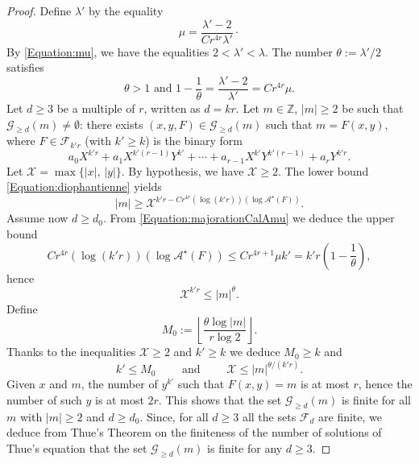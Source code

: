 \documentclass[10pt]{article}
\theoremstyle{definition}
\numberwithin{equation}{section}
\newcommand {\Z}{{\mathbb{Z}}}
\begin{document}
 
\begin{proof} Define $\lambda'$ by the equality 
\[
\mu = \frac{\lambda' -2} {C r^{4r} \lambda'}\cdotp
\]
By \eqref{Equation:mu}, we have the equalities $2 < \lambda' < \lambda$. The number $\theta := \lambda'/2$ satisfies
\[
\theta >1 \text{ and } 1-\frac 1 \theta = \frac{\lambda'-2}{\lambda'} = Cr^{4r}\mu.
\]
Let $d\geqslant 3$ be a multiple of $r$, written as $d=kr$. Let $m\in \Z$, $\vert m \vert \geqslant 2$ be such that $\mathcal G_{\geqslant d} (m) \neq \emptyset$: there exists $(x,y, F) \in {\mathcal G}_{\geqslant d} (m)$ such that $m=F(x,y)$, where $F\in \mathcal F_{k'r} $ (with $k'\geqslant k$) is the binary form
\[
a_0 X^{k'r} +a_1 X^{k'(r-1)} Y^{k'}+\cdots +a_{r-1} X^{k'} Y^{k'(r-1)} + a_r Y^{k'r}.
\]
Let $\mathcal X = \max \{ \vert x \vert, \, \vert y \vert \}$. By hypothesis, we have $\mathcal X \geqslant 2$. The lower bound \eqref{Equation:diophantienne} yields 
\[
\vert m \vert \geqslant \mathcal X^{k'r -Cr^{4r} (\log (k'r))(\log \mathcal A^\star (F))}.
\]
Assume now $d\geqslant d_0$. 
From \eqref{Equation:majorationCalAmu} we deduce the upper bound
\[
Cr^{4r} (\log (k'r)) (\log \mathcal A^\star (F)) \leqslant Cr^{4r+1} \mu k' = k'r \left( 1 -\frac 1 \theta \right),
\]
hence
\[
\mathcal X^{k'r} \leqslant \vert m \vert^\theta.
\]
Define
\[
M_0:= \left\lfloor \frac{\theta \log \vert m \vert}{r \log 2}\right\rfloor.
 \] 
Thanks to the inequalities $\mathcal X \geqslant 2$ and $k'\geqslant k$ we deduce $M_0\geqslant k$ and
\begin{equation}\label{Equation:M0}
k'\leqslant M_0 \qquad \text{ and } \qquad \mathcal X \leqslant \vert m \vert ^{\theta/ (k'r)}.
\end{equation}
Given $x$ and $m$, the number of $y^{k'}$ such that $F(x,y)=m$ is at most $r$, hence the number of such $y$ is at most $2r$. This shows that the set $\mathcal G_{\geqslant d} (m)$ is finite for all $m$ with $|m|\geqslant 2$ and $d\geqslant d_0$. Since, for all $d \geqslant 3$ all the sets $\mathcal F_d$ are finite, we deduce from Thue's Theorem on the finiteness of the number of solutions of Thue's equation that the set $\mathcal G_{\geqslant d} (m)$
is finite for any $d\geqslant 3$.


\end{proof}
\end{document}
